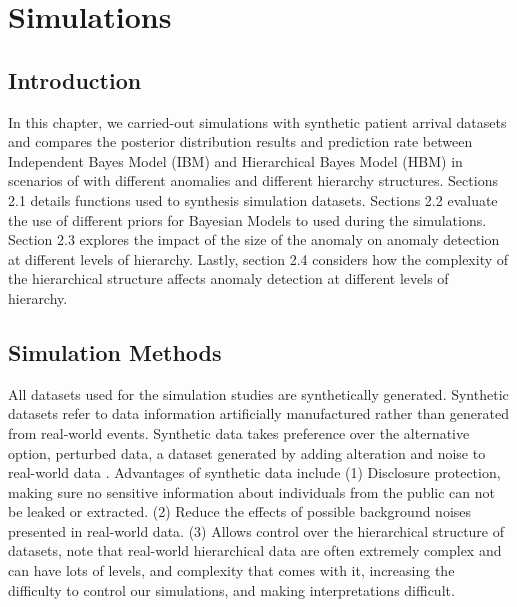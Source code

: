 \chapter{Simulations}\label{chap:Simulations}

\section{Introduction}

In this chapter, we carried-out simulations with synthetic patient arrival datasets and compares the posterior distribution results and prediction rate between Independent Bayes Model (IBM) and Hierarchical Bayes Model (HBM) in scenarios of with different anomalies and different hierarchy structures. Sections 2.1 details functions used to synthesis simulation datasets. Sections 2.2 evaluate the use of different priors for Bayesian Models to used during the simulations. Section 2.3 explores the impact of the size of the anomaly on anomaly detection at different levels of hierarchy. Lastly, section 2.4 considers how the complexity of the hierarchical structure affects anomaly detection at different levels of hierarchy. 

\section{Simulation Methods}

All datasets used for the simulation studies are synthetically generated. Synthetic datasets refer to data information artificially manufactured rather than generated from real-world events. Synthetic data takes preference over the alternative option, perturbed data, a dataset generated by adding alteration and noise to real-world data \citep{drechsler2008comparing, drechsler2011synthetic}. Advantages of synthetic data include (1) Disclosure protection, making sure no sensitive information about individuals from the public can not be leaked or extracted. (2) Reduce the effects of possible background noises presented in real-world data. (3) Allows control over the hierarchical structure of datasets, note that real-world hierarchical data are often extremely complex and can have lots of levels, and complexity that comes with it, increasing the difficulty to control our simulations, and making interpretations difficult.  


\newpara


